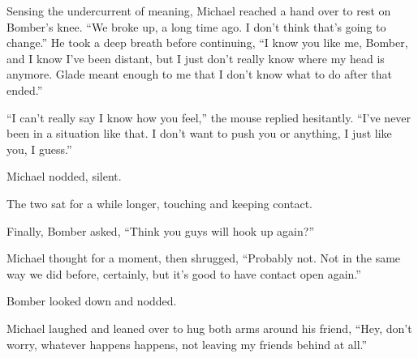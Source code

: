 Sensing the undercurrent of meaning, Michael reached a hand over to rest on Bomber's knee.  ``We broke up, a long time ago. I don't think that's going to change.''  He took a deep breath before continuing, ``I know you like me, Bomber, and I know I've been distant, but I just don't really know where my head is anymore.  Glade meant enough to me that I don't know what to do after that ended.''

``I can't really say I know how you feel,'' the mouse replied hesitantly.  ``I've never been in a situation like that.  I don't want to push you or anything, I just like you, I guess.''

Michael nodded, silent.

The two sat for a while longer, touching and keeping contact.

Finally, Bomber asked, ``Think you guys will hook up again?''

Michael thought for a moment, then shrugged, ``Probably not.  Not in the same way we did before, certainly, but it's good to have contact open again.''

Bomber looked down and nodded.

Michael laughed and leaned over to hug both arms around his friend, ``Hey, don't worry, whatever happens happens, not leaving my friends behind at all.''
